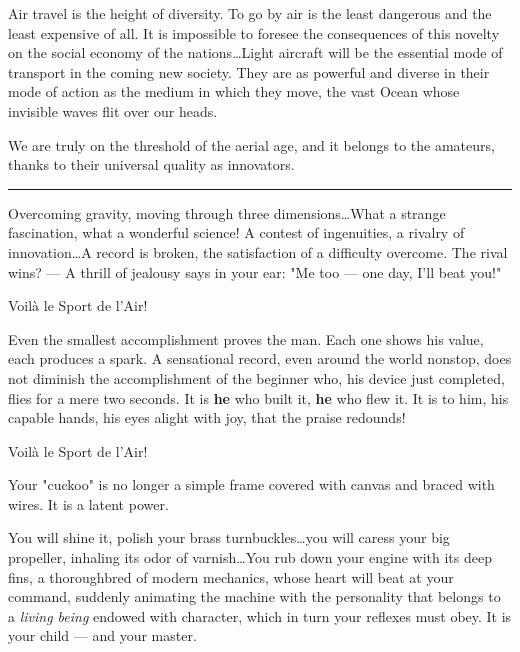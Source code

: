 \documentclass{book}
\newcommand*\sectline{
  \vspace{5pt}
  \begin{center}
    \rule{0.5\linewidth}{\linethickness}
  \end{center}
  \vspace{5pt}
}
\begin{document}
Air travel is the height of diversity. To go by air is the least
dangerous and the least expensive of all.  It is impossible to foresee
the consequences of this novelty on the social economy of the
nations\ldots Light aircraft will be the essential mode of transport
in the coming new society.  They are as powerful and diverse in their
mode of action as the medium in which they move, the vast Ocean whose
invisible waves flit over our heads.

We are truly on the threshold of the aerial age, and it belongs to the
amateurs, thanks to their universal quality as innovators.

\sectline

Overcoming gravity, moving through three dimensions\ldots What a
strange fascination, what a wonderful science!  A contest of
ingenuities, a rivalry of innovation\ldots A record is broken, the
satisfaction of a difficulty overcome. The rival wins? --- A thrill of
jealousy says in your ear: "Me too --- one day, I'll beat you!"

{
  \selectfont
  \begin{center}
    {\Large Voil\`a le Sport de l'Air!}
  \end{center}
}

Even the smallest accomplishment proves the man.  Each one shows his
value, each produces a spark. A sensational record, even around the
world nonstop, does not diminish the accomplishment of the beginner
who, his device just completed, flies for a mere two seconds.  It is
\textbf{he} who built it, \textbf{he} who flew it.  It is to him, his
capable hands, his eyes alight with joy, that the praise redounds!

{
  \selectfont
  \begin{center}
    {\huge Voil\`a le Sport de l'Air!}
  \end{center}
}

Your "cuckoo" is no longer a simple frame covered with canvas and
braced with wires. It is a latent power.

You will shine it, polish your brass turnbuckles\ldots you will caress
your big propeller, inhaling its odor of varnish\ldots You rub down
your engine with its deep fins, a thoroughbred of modern mechanics,
whose heart will beat at your command, suddenly animating the machine
with the personality that belongs to a \textit{living being} endowed
with character, which in turn your reflexes must obey. It is your
child --- and your master.
\end{document}

